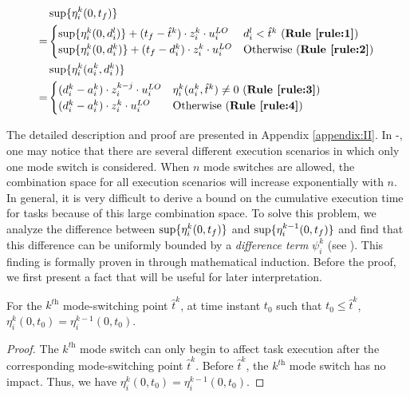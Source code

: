 \documentclass[10pt,journal,compsoc]{IEEEtran}
\begin{document}
\begin{small}
\begin{align}
\label{eq:dp1}
&\sups{\eta_i^k(0,t_f)} \nonumber\\
=&
\begin{cases} 
\sups{\eta_i^k(0,d_i^{l})}+(t_f-\hat{t}^k)\cdot{}z_i^k\cdot{}u_i^{LO} &\text{$d_i^{l}<\hat{t}^k$ (\textbf{\ruleref{rule:1}})}\\
\sups{\eta_i^k(0,d_i^{k})}+(t_f-d_i^{k})\cdot{}z_i^k\cdot{}u_i^{LO} &\text{Otherwise (\textbf{\ruleref{rule:2}})} \\
\end{cases}\\ 
\label{eq:dp2}
&\sups{\eta_i^k(a_i^k,d_i^{k})} \nonumber\\
=&
\begin{cases} 
{(d_i^k-a_i^k)\cdot{z_i^{k-j}}\cdot{u_i^{LO}}} &\text{$\eta_i^k(a_i^k,\hat{t}^{k})\neq{0}$ (\textbf{\ruleref{rule:3}})}\\
{(d_i^k-a_i^k)\cdot{z_i^{k}}\cdot{u_i^{LO}}} &\text{Otherwise (\textbf{\ruleref{rule:4}})}
\end{cases}
\end{align}
\end{small}

The detailed description and proof are presented in Appendix \ref{appendix:II}. In -, one may notice that there are several different execution scenarios in which only one mode switch is considered. When $n$ mode switches are allowed, the combination space for all execution scenarios will increase exponentially with $n$. In general, it is very difficult to derive a bound on the cumulative execution time for \lo tasks because of this large combination space. To solve this problem, we analyze the difference between $\sup\{\eta_i^{k}(0,t_f)\}$ and $\sup\{\eta_i^{k-1}(0,t_f)\}$ and find that this difference can be uniformly bounded by a \textit{difference term} $\psi_i^{k}$ (see ). This finding is formally proven in  through mathematical induction. Before the proof, we first present a fact that will be useful for later interpretation.
\begin{fact}
\label{rule:5}
For the $k^{\textit{th}}$ mode-switching point $\hat{t}^{k}$, at time instant $t_0$ such that $t_0\le{\hat{t}^{k}}$, $\eta_i^k(0,t_0)=\eta_i^{k-1}(0,t_0)$.
\end{fact}
\begin{proof}
The $k^{\textit{th}}$ mode switch can only begin to affect \lo task execution after the corresponding mode-switching point $\hat{t}^{k}$. Before $\hat{t}^{k}$, the $k^{\textit{th}}$ mode switch has no impact. Thus,  we have $\eta_i^k(0,t_0)=\eta_i^{k-1}(0,t_0)$.    
\end{proof}
\end{document}

